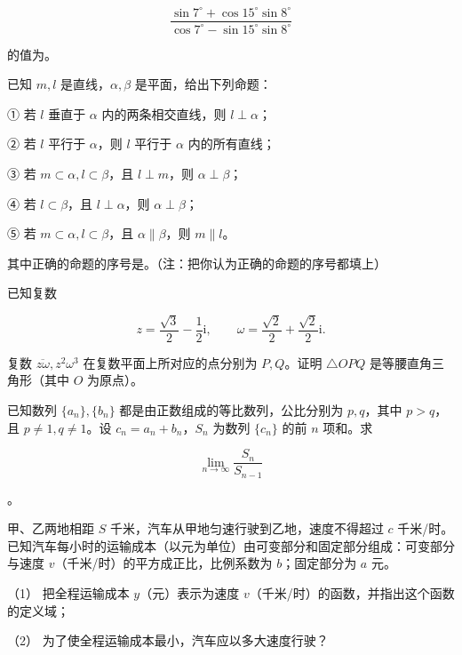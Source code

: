 \begin{question}

\nopagebreak[4]
\[
\dfrac{\sin7^\circ+\cos15^\circ\sin8^\circ}
{\cos7^\circ-\sin15^\circ\sin8^\circ}
\]

的值为\gkblank{}。

\end{question}
\begin{question}
已知 $m,l$ 是直线，$\alpha,\beta$ 是平面，给出下列命题：

① 若 $l$ 垂直于 $\alpha$ 内的两条相交直线，则 $l\perp\alpha$；

② 若 $l$ 平行于 $\alpha$，则 $l$ 平行于 $\alpha$ 内的所有直线；

③ 若 $m\subset\alpha,l\subset\beta$，且 $l\perp m$，则 $\alpha\perp\beta$；

④ 若 $l\subset\beta$，且 $l\perp\alpha$，则 $\alpha\perp\beta$；

⑤ 若 $m\subset\alpha,l\subset\beta$，且 $\alpha\parallel\beta$，则 $m\parallel l$。

其中正确的命题的序号是\gkblank{}。（注：把你认为正确的命题的序号都填上）

\end{question}
\begin{question}
已知复数

\nopagebreak[4]
\[
z=\dfrac{\sqrt3}{2}-\dfrac12\mathrm{i},\qquad
\omega=\dfrac{\sqrt2}{2}+\dfrac{\sqrt2}{2}\mathrm{i}.
\]

复数 $\overline{z\omega},z^2\omega^3$ 在复数平面上所对应的点分别为 $P,Q$。证明 $\triangle OPQ$ 是等腰直角三角形（其中 $O$ 为原点）。

\end{question}
\begin{question}
已知数列 $\{a_n\},\{b_n\}$ 都是由正数组成的等比数列，公比分别为 $p,q$，其中 $p>q$，且 $p\neq1,q\neq1$。设 $c_n=a_n+b_n$，$S_n$ 为数列 $\{c_n\}$ 的前 $n$ 项和。求

\nopagebreak[4]
\[
\lim_{n\to\infty}\dfrac{S_n}{S_{n-1}}
\]

。

\end{question}
\begin{question}
甲、乙两地相距 $S$ 千米，汽车从甲地匀速行驶到乙地，速度不得超过 $c$ 千米/时。已知汽车每小时的运输成本（以元为单位）由可变部分和固定部分组成：可变部分与速度 $v$（千米/时）的平方成正比，比例系数为 $b$；固定部分为 $a$ 元。

（1） 把全程运输成本 $y$（元）表示为速度 $v$（千米/时）的函数，并指出这个函数的定义域；

（2） 为了使全程运输成本最小，汽车应以多大速度行驶？

\Needspace{0.4\textheight}
\end{question}
